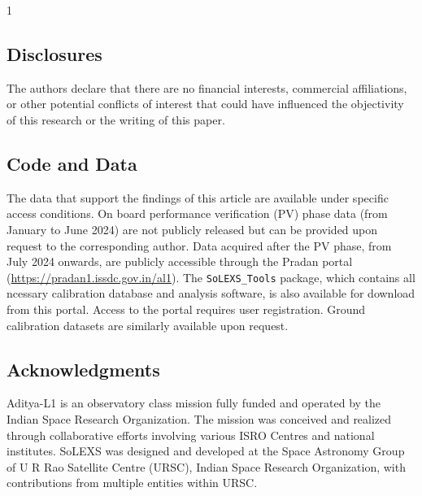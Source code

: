 \documentclass[12pt]{spieman}  %
\begin{document}
\begin{spacing}{1}
\subsection*{Disclosures}
The authors declare that there are no financial interests, commercial affiliations, or other potential conflicts of interest that could have influenced the objectivity of this research or the writing of this paper.



\subsection*{Code and Data}
The data that support the findings of this article are available under specific access conditions. On board performance verification (PV) phase data (from January to June 2024) are not publicly released but can be provided upon request to the corresponding author. Data acquired after the PV phase, from July 2024 onwards, are publicly accessible through the Pradan portal (\url{https://pradan1.issdc.gov.in/al1}). 
The \texttt{SoLEXS\_Tools} package, which contains all ncessary calibration database and analysis software, is also available for download from this portal. Access to the portal requires user registration. 
Ground calibration datasets are similarly available upon request. 


\subsection* {Acknowledgments}

Aditya-L1 is an observatory class mission fully funded and operated by the Indian Space Research Organization. The mission was conceived and realized through collaborative efforts involving various ISRO Centres and national institutes. SoLEXS was designed and developed at the Space Astronomy Group of U R Rao Satellite Centre (URSC), Indian Space Research Organization, with contributions from multiple entities within URSC. 


\end{spacing}
\end{document}
